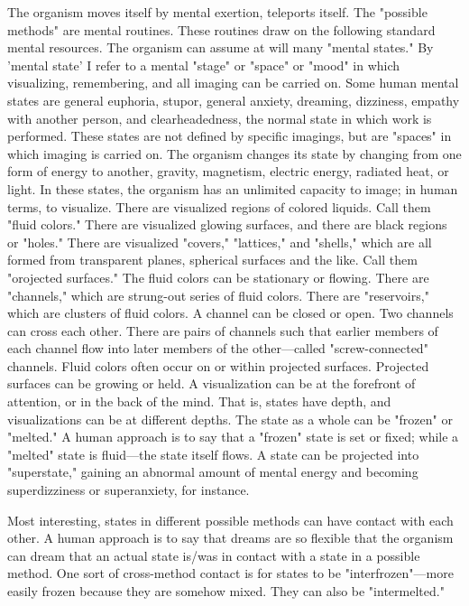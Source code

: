 \documentclass[10pt,twoside,draft]{memoir}
\begin{document}
{{The organism moves itself by mental exertion, teleports itself. The 
"possible methods" are mental routines. These routines draw on the 
following standard mental resources. The organism can assume at will many 
"mental states." By 'mental state' I refer to a mental "stage" or "space" or 
"mood" in which visualizing, remembering, and all imaging can be carried 
on. Some human mental states are general euphoria, stupor, general anxiety, 
dreaming, dizziness, empathy with another person, and clearheadedness, the 
normal state in which work is performed. These states are not defined by 
specific imagings, but are "spaces" in which imaging is carried on. The 
organism changes its state by changing from one form of energy to another, 
gravity, magnetism, electric energy, radiated heat, or light. In these states, 
the organism has an unlimited capacity to image; in human terms, to 
visualize. There are visualized regions of colored liquids. Call them "fluid 
colors." There are visualized glowing surfaces, and there are black regions or 
"holes." There are visualized "covers," "lattices," and "shells," which are all 
formed from transparent planes, spherical surfaces and the like. Call them 
"orojected surfaces." The fluid colors can be stationary or flowing. There are 
"channels," which are strung-out series of fluid colors. There are 
"reservoirs," which are clusters of fluid colors. A channel can be closed or 
open. Two channels can cross each other. There are pairs of channels such 
that earlier members of each channel flow into later members of the 
other---called "screw-connected" channels. Fluid colors often occur on or 
within projected surfaces. Projected surfaces can be growing or held. A 
visualization can be at the forefront of attention, or in the back of the mind. 
That is, states have depth, and visualizations can be at different depths. The 
state as a whole can be "frozen" or "melted." A human approach is to say 
that a "frozen" state is set or fixed; while a "melted" state is fluid---the state 
itself flows. A state can be projected into "superstate," gaining an abnormal 
amount of mental energy and becoming superdizziness or superanxiety, for 
instance. 

Most interesting, states in different possible methods can have contact 
with each other. A human approach is to say that dreams are so flexible that 
the organism can dream that an actual state is\slash was in contact with a state in 
a possible method. One sort of cross-method contact is for states to be 
"interfrozen"---more easily frozen because they are somehow mixed. They 
can also be "intermelted." 

}}
\end{document}
